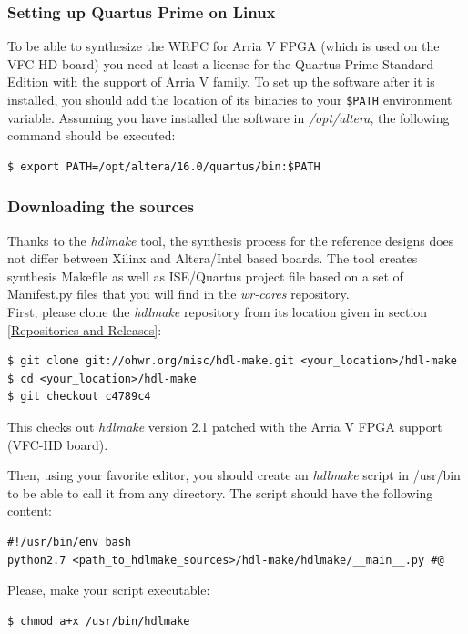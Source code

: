 \documentclass[a4paper, 12pt]{article}
\renewcommand{\_}{\underscore\allowbreak}
\begin{document}
\subsubsection{Setting up Quartus Prime on Linux}
\label{Setting up Quartus Prime}
To be able to synthesize the WRPC for Arria V FPGA (which is used on the VFC-HD
board) you need at least a license for the Quartus Prime Standard Edition with
the support of Arria V family. To set up the software after it is installed, you
should add the location of its binaries to your \texttt{\$PATH} environment
variable. Assuming you have installed the software in \textit{/opt/altera}, the
following command should be executed:
\begin{lstlisting}
$ export PATH=/opt/altera/16.0/quartus/bin:$PATH
\end{lstlisting}

\subsubsection{Downloading the sources}
Thanks to the \textit{hdlmake} tool, the synthesis process for the reference
designs does not differ between Xilinx and Altera/Intel based boards. The tool creates
synthesis Makefile as well as ISE/Quartus project file based on a set of
Manifest.py files that you will find in the \textit{wr-cores} repository.\\

First, please clone the \textit{hdlmake} repository from its location given in
section \ref{Repositories and Releases}:
\begin{lstlisting}
$ git clone git://ohwr.org/misc/hdl-make.git <your_location>/hdl-make
$ cd <your_location>/hdl-make
$ git checkout c4789c4
\end{lstlisting}
This checks out \textit{hdlmake} version 2.1 patched with the Arria V FPGA
support (VFC-HD board).

Then, using your favorite editor, you should create an \textit{hdlmake} script in
/usr/bin to be able to call it from any directory. The script should have the
following content:
\begin{lstlisting}
#!/usr/bin/env bash
python2.7 <path_to_hdlmake_sources>/hdl-make/hdlmake/__main__.py #@
\end{lstlisting}

Please, make your script executable:
\begin{lstlisting}
$ chmod a+x /usr/bin/hdlmake
\end{lstlisting}
\end{document}
